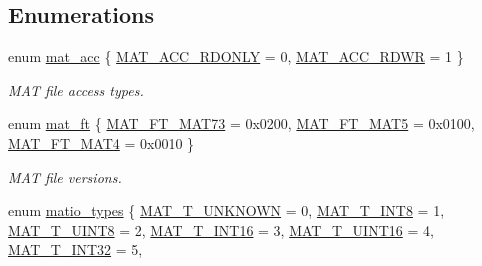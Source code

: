 \subsection*{\-Enumerations}
\begin{DoxyCompactItemize}
\item 
enum \hyperlink{group__MAT_gaa9dcbc70f538af79bd557593ff6b5cdb}{mat\-\_\-acc} \{ \hyperlink{group__MAT_ggaa9dcbc70f538af79bd557593ff6b5cdba8dd1457651b27ba9bea6cfba158c037c}{\-M\-A\-T\-\_\-\-A\-C\-C\-\_\-\-R\-D\-O\-N\-L\-Y} =  0, 
\hyperlink{group__MAT_ggaa9dcbc70f538af79bd557593ff6b5cdba0f65f27ea42fde32d62b702b82329c1f}{\-M\-A\-T\-\_\-\-A\-C\-C\-\_\-\-R\-D\-W\-R} =  1
 \}
\begin{DoxyCompactList}\small\item\em \-M\-A\-T file access types. \end{DoxyCompactList}\item 
enum \hyperlink{group__MAT_gad03442b8378999189d510e3745c702b7}{mat\-\_\-ft} \{ \hyperlink{group__MAT_ggad03442b8378999189d510e3745c702b7a765c5d1d5038947646260dc82483517e}{\-M\-A\-T\-\_\-\-F\-T\-\_\-\-M\-A\-T73} =  0x0200, 
\hyperlink{group__MAT_ggad03442b8378999189d510e3745c702b7a31ade1f6989411dc0299007e2c7d33b2}{\-M\-A\-T\-\_\-\-F\-T\-\_\-\-M\-A\-T5} =  0x0100, 
\hyperlink{group__MAT_ggad03442b8378999189d510e3745c702b7a858b4f5da65548219b1c3ad47aa478d3}{\-M\-A\-T\-\_\-\-F\-T\-\_\-\-M\-A\-T4} =  0x0010
 \}
\begin{DoxyCompactList}\small\item\em \-M\-A\-T file versions. \end{DoxyCompactList}\item 
enum \hyperlink{group__MAT_gacf7b3b879282b7ab3a51190e49bf3453}{matio\-\_\-types} \{ \*
\hyperlink{group__MAT_ggacf7b3b879282b7ab3a51190e49bf3453a2a7318fe8bf9464935e7ed8902618293}{\-M\-A\-T\-\_\-\-T\-\_\-\-U\-N\-K\-N\-O\-W\-N} =  0, 
\hyperlink{group__MAT_ggacf7b3b879282b7ab3a51190e49bf3453a9807f5033ed4f9b548953742d9fd1658}{\-M\-A\-T\-\_\-\-T\-\_\-\-I\-N\-T8} =  1, 
\hyperlink{group__MAT_ggacf7b3b879282b7ab3a51190e49bf3453a01c1bd7db68f90552862eb5d311be408}{\-M\-A\-T\-\_\-\-T\-\_\-\-U\-I\-N\-T8} =  2, 
\hyperlink{group__MAT_ggacf7b3b879282b7ab3a51190e49bf3453a8c5b2e381946e95ea8d81ac216743302}{\-M\-A\-T\-\_\-\-T\-\_\-\-I\-N\-T16} =  3, 
\*
\hyperlink{group__MAT_ggacf7b3b879282b7ab3a51190e49bf3453a05bc7af7680aa68be95126ae0a4c2e31}{\-M\-A\-T\-\_\-\-T\-\_\-\-U\-I\-N\-T16} =  4, 
\hyperlink{group__MAT_ggacf7b3b879282b7ab3a51190e49bf3453a83e06a68320726c6572bfbb9f3addb1d}{\-M\-A\-T\-\_\-\-T\-\_\-\-I\-N\-T32} =  5, 

\end{DoxyCompactItemize}
